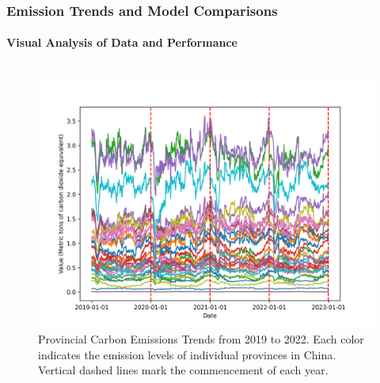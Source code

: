 \documentclass[light]{lutbeamer} %
\begin{document}
\begin{frame}
    \frametitle{Emission Trends and Model Comparisons}
    \framesubtitle{Visual Analysis of Data and Performance}

    \begin{columns}[T] %

        \begin{column}{0.48\textwidth}
            \begin{figure}
                \centering
                \includegraphics[width=\textwidth]{figures/combined_trend_plot.png}
                \caption{Provincial Carbon Emissions Trends from 2019 to 2022. Each color indicates the emission levels of individual provinces in China. Vertical dashed lines mark the commencement of each year.}
            \end{figure}
        \end{column}


\end{columns}
\end{frame}
\end{document}

